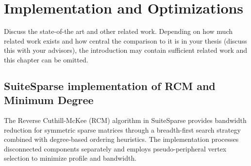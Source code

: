 \chapter{Implementation and Optimizations}
\label{ch:implementation_and_optimizations}

Discuss the state-of-the art and other related work.
Depending on how much related work exists and how central the comparison to it is in your thesis (discuss this with your advisors), the introduction may contain sufficient related work and this chapter can be omitted.

\section{SuiteSparse implementation of RCM and Minimum Degree}

The Reverse Cuthill-McKee (RCM) algorithm in SuiteSparse provides bandwidth reduction for symmetric sparse matrices through a breadth-first search strategy combined with degree-based ordering heuristics. The implementation processes disconnected components separately and employs pseudo-peripheral vertex selection to minimize profile and bandwidth.

